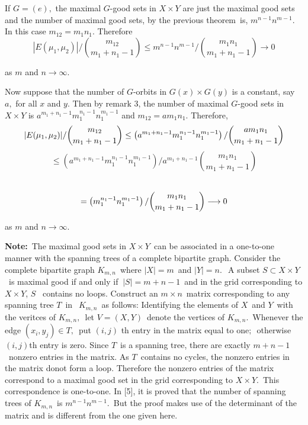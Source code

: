 \documentclass{article}
\begin{document}
{\large If $G=(e),$ the maximal $G$-good sets in $X\times Y$ are just the
maximal good sets and the number of maximal good sets, by the previous
theorem\ is, $m^{n-1}n^{m-1}.$ In this case $m_{12}=m_{1}n_{1}.$ Therefore
\begin{equation*}
|E(\mu _{1},\mu _{2})|/\binom{m_{12}}{m_{1}+n_{1}-1}\leq m^{n-1}n^{m-1}/%
\binom{m_{1}n_{1}}{m_{1}+n_{1}-1}\longrightarrow 0
\end{equation*}
}

{\large as $m$ and $n\longrightarrow \infty .$ }

{\large Now suppose that the number of $G$-orbits in $G(x)\times G(y)$ is a
constant, say $a,$ for all $x$ and $y.$ Then by remark 3, the number of
maximal $G$-good sets in $X\times Y$ is $%
a^{m_{1}+n_{1}-1}m_{1}^{n_{1}-1}n_{1}^{m_{1}-1}$ and $m_{12}=am_{1}n_{1}.$
Therefore,
\begin{equation*}
|E(\mu _{1},\mu _{2})|/\binom{m_{12}}{m_{1}+n_{1}-1}\leq \left(
a^{m_{1}+n_{1}-1}m_{1}^{n_{1}-1}n_{1}^{m_{1}-1}\right) /\binom{am_{1}n_{1}}{%
m_{1}+n_{1}-1}
\end{equation*}
\begin{equation*}
\leq \left( a^{m_{1}+n_{1}-1}m_{1}^{n_{1}-1}n_{1}^{m_{1}-1}\right)
/a^{m_{1}+n_{1}-1}\binom{m_{1}n_{1}}{m_{1}+n_{1}-1}
\end{equation*}
\ }

{\large
\begin{equation*}
=\left( m_{1}^{n_{1}-1}n_{1}^{m_{1}-1}\right) /\binom{m_{1}n_{1}}{%
m_{1}+n_{1}-1}\longrightarrow 0
\end{equation*}
}

{\large as $m$ and $n\longrightarrow \infty .$ }

{\large \bigskip }

{\large \textbf{Note:}\ The maximal good sets in $X\times Y$\ can be
associated in a one-to-one manner with the spanning trees of a complete
bipartite graph. Consider the complete bipartite graph $K_{m,n}$\ where $%
|X|=m$\ and $|Y|=n.\ $\ A subset $S\subset X\times Y\ $\ is maximal good if
and only if $\ |S|=m+n-1$\ and in the grid corresponding to $X\times Y$, $S$%
\ contains no loops. Construct an $m\times n$\ matrix corresponding to any
spanning tree $T$\ in $\ \ K_{m,n}$\ as follows: Identifying the elements of
$X$\ and $Y$\ with the veritces of $K_{m,n},$\ let $V=(X,Y)$\ denote the
vertices of $K_{m,n}.$\ Whenever the edge $(x_{i},y_{j})\in T,$\ put $(i,j)$%
th entry in the matrix equal to one$;$\ otherwise $(i,j)$th entry is zero.
Since $T$\ is a spanning tree, there are exactly $m+n-1$\ nonzero entries in
the matrix. As $T$\ contains no cycles, the nonzero entries in the matrix
donot form a loop. Therefore the nonzero entries of the matrix correspond to
a maximal good set in the grid corresponding to $X\times Y.$\ This
correspondence is one-to-one. In [5], it is proved that the number of
spanning trees of $K_{m,n}$\ is $m^{n-1}n^{m-1}.$\ But the proof makes use
of the determinant of the matrix and is different from the one given here. }
\end{document}
